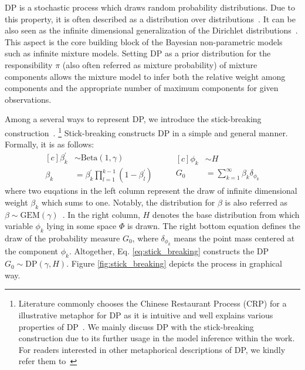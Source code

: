 \documentclass{article}
\begin{document}
DP is a stochastic process which draws random probability distributions. Due to this property, it is often described as a distribution over distributions~\cite{DBLP:reference/ml/Teh17}. It can be also seen as the infinite dimensional generalization of the Dirichlet distributions~\cite{DBLP:reference/ml/Teh17}.
This aspect is the core building block of the Bayesian non-parametric models such as infinite mixture models. Setting DP as a prior distribution for the responsibility $\pi$ (also often referred as mixture probability) of mixture components allows the mixture model to infer both the relative weight among components and the appropriate number of maximum components for given observations.

Among a several ways to represent DP, we introduce the stick-breaking construction~\cite{sethuraman94}.
\footnote{Literature commonly chooses the Chinese Restaurant Process (CRP) for a illustrative metaphor for DP as it is intuitive and well explains various properties of DP~\cite{DBLP:reference/ml/Teh17}. We mainly discuss DP with the stick-breaking construction due to its further usage in the model inference within the work. For readers interested in other metaphorical descriptions of DP, we kindly refer them to~\cite{DBLP:reference/ml/Teh17, DBLP:conf/ismir/HoffmanBC08}}
Stick-breaking constructs DP in a simple and general manner. Formally, it is as follows:
\begin{equation}\label{eq:stick_breaking}
\begin{aligned}[c]
    \beta^{\prime}_{k} &\sim \text{Beta}(1, \gamma) \\
    \beta_{k} &= \beta^{\prime}_{k} \prod_{l=1}^{k-1} (1 - \beta_{l}^{\prime})
\end{aligned}
\qquad
\begin{aligned}[c]
    \phi_{k} &\sim H \\
    G_{0} &= \sum^{\infty}_{k=1} \beta_{k}\delta_{\phi_{k}}
\end{aligned}
\end{equation}
where two euqations in the left column represent the draw of infinite dimensional weight $\beta_{k}$ which sums to one. Notably, the distribution for $\beta$ is also referred as $\beta \sim \text{GEM}(\gamma)$~\cite{DBLP:journals/cpc/Pitman02}. In the right column, $H$ denotes the base distribution from which variable $\phi_{k}$ lying in some space $\Phi$ is drawn. The right bottom equation defines the draw of the probability measure $G_{0}$, where $\delta_{\phi_{k}}$ means the point mass centered at the component $\phi_{k}$. Altogether, Eq. \ref{eq:stick_breaking} constructs the DP $G_{0} \sim \text{DP}(\gamma, H)$. Figure \ref{fig:stick_breaking} depicts the process in graphical way.
\end{document}
